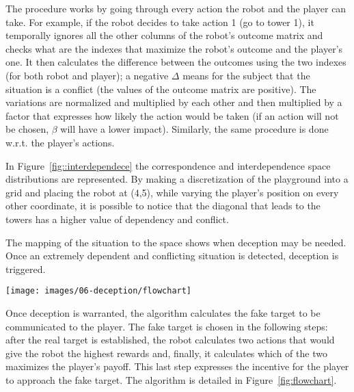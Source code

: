 The procedure works by going through every action the robot and the player can take. For example, if the robot decides to take action 1 (go to tower 1), it temporally ignores all the other columns of the robot's outcome matrix and checks what are the indexes that maximize the robot's outcome and the player's one. It then calculates the difference between the outcomes using the two indexes (for both robot and player); a negative $\Delta$ means for the subject that the situation is a conflict (the values of the outcome matrix are positive). The variations are normalized and multiplied by each other and then multiplied by a factor that expresses how likely the action would be taken (if an action will not be chosen, $\beta$ will have a lower impact). Similarly, the same procedure is done w.r.t. the player's actions.

In Figure~\ref{fig::interdependece} the correspondence and interdependence space distributions are represented. By making a discretization of the playground into a grid and placing the robot at (4,5), while varying the  player's position on every other coordinate, it is possible to notice that the diagonal that leads to the towers has a higher value of dependency and conflict.

The mapping of the situation to the space shows when deception may be needed. Once an extremely dependent and conflicting situation is detected, deception is triggered.

\begin{figure*}[t]
\centering
\texttt{[image: images/06-deception/flowchart]}
\caption{The procedure to select deception.}
\label{fig:flowchart}
\end{figure*}

Once deception is warranted, the algorithm calculates the fake target to be communicated to the player. The fake target is chosen in the following steps: after the real target is established, the robot calculates two actions that would give the robot the highest rewards and, finally, it calculates which of the two maximizes the player's payoff. This last step expresses the incentive for the player to approach the fake target. The algorithm is detailed in Figure~\ref{fig:flowchart}.

